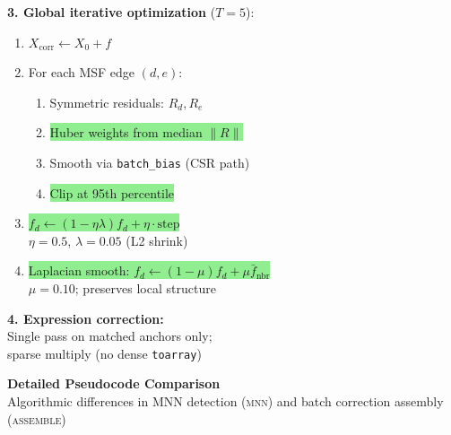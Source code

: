 \documentclass[8pt]{article}
\newlength{\colw}
\begin{document}
\begin{minipage}[t]{\colw}
\begin{keyboxG}
\textbf{3. Global iterative optimization} ($T{=}5$):
\begin{enumerate}[leftmargin=1em, itemsep=0pt, topsep=1pt, parsep=0pt]
\item $X_\text{corr} \gets X_0 + f$ 
\item For each MSF edge $(d,e)$:
\begin{enumerate}[leftmargin=0.5em, itemsep=0pt, topsep=0pt]
\item[\textbullet] Symmetric residuals: $R_d, R_e$
\item[\textbullet] \colorbox{lightgreen}{Huber weights from median $\|R\|$}
\item[\textbullet] Smooth via \texttt{batch\_bias} (CSR path)
\item[\textbullet] \colorbox{lightgreen}{Clip at 95th percentile}
\end{enumerate}
\item \colorbox{lightgreen}{$f_d \gets (1{-}\eta\lambda)f_d + \eta \cdot \text{step}$}\\
    {\scriptsize $\eta{=}0.5$, $\lambda{=}0.05$ (L2 shrink)}
\item \colorbox{lightgreen}{Laplacian smooth: $f_d \gets (1{-}\mu)f_d + \mu \bar{f}_\text{nbr}$}\\
    {\scriptsize $\mu{=}0.10$; preserves local structure}
\end{enumerate}
\end{keyboxG}\vspace{1pt}

\begin{keyboxG}
\textbf{4. Expression correction:}\\
Single pass on matched anchors only;\\
sparse multiply (no dense \texttt{toarray})
\end{keyboxG}
\end{minipage}

\newpage

\begin{center}
{\large\bfseries Detailed Pseudocode Comparison}\\[3pt]
{\normalsize Algorithmic differences in MNN detection (\textsc{mnn}) and batch correction assembly (\textsc{assemble})}
\end{center}
\vspace{4pt}
\end{document}
